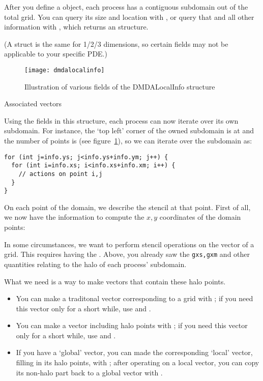 
After you define a  object, each process has a contiguous
subdomain out of the total grid.
You can query its size and location with ,
or query that and all other information with ,
which returns an  structure.

(A  struct is the same for 1/2/3 dimensions,
so certain fields may not be applicable to your specific \ac{PDE}.)

\begin{figure}[ht]
  \texttt{[image: dmdalocalinfo]}
  \caption{Illustration of various fields of the DMDALocalInfo structure}
  \label{fig:dmdalocalinfo}
\end{figure}

 {Associated vectors}

Using the fields in this structure, each process can now iterate over its
own subdomain.
For instance, the `top left' corner of the owned subdomain is at 
and the number of points is 
(see figure~\ref{fig:dmdalocalinfo}),
so we can iterate over the subdomain as:

\begin{lstlisting}
for (int j=info.ys; j<info.ys+info.ym; j++) {
  for (int i=info.xs; i<info.xs+info.xm; i++) {
    // actions on point i,j
  }
}
\end{lstlisting}

On each point of the domain, we describe the stencil at that point.
First of all, we now have the information to compute the $x,y$ coordinates
of the domain points:
%

In some circumstances, we want to perform stencil operations
on the vector of a  grid.
This requires having the .
Above, you already saw the \lstinline{gxs,gxm} and other
quantities relating to the halo of each process' subdomain.

What we need is a way to make vectors that contain these halo points.
\begin{itemize}
\item You can make a traditonal vector corresponding to a grid with
  ;
  if you need this vector only for a short while,
  use  and .
\item You can make a vector including halo points with
  ;
  if you need this vector only for a short while,
  use  and .
\item If you have a `global' vector, you can made the corresponding `local' vector,
  filling in its halo points, with ;
  after operating on a local vector, you can copy its non-halo part back
  to a global vector with .
\end{itemize}

